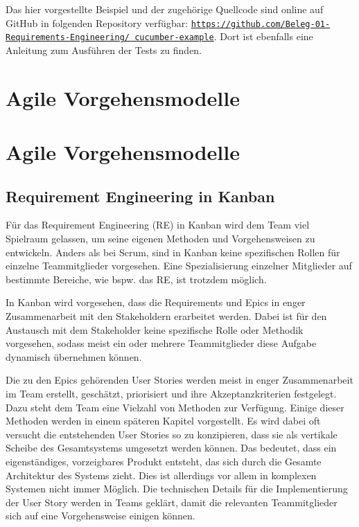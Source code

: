 \documentclass[acmtog]{acmart}
\begin{document}
Das hier vorgestellte Beispiel und der zugehörige Quellcode sind online auf GitHub in folgenden Repository verfügbar:
\href{https://github.com/Beleg-01-Requirements-Engineering/cucumber-example}{\texttt{https://github.com/Beleg-01-Requirements-Engineering/
		cucumber-example}}.
Dort ist ebenfalls eine Anleitung zum Ausführen der Tests zu finden.


\section{Agile Vorgehensmodelle}

\section{Agile Vorgehensmodelle}

\subsection{Requirement Engineering in Kanban}

Für das Requirement Engineering (RE) in Kanban wird dem Team viel Spielraum gelassen, 
um seine eigenen Methoden und Vorgehensweisen zu entwickeln. Anders als bei Scrum, sind 
in Kanban keine spezifischen Rollen für einzelne Teammitglieder vorgesehen. Eine 
Spezialisierung einzelner Mitglieder auf bestimmte Bereiche, wie bspw. das RE, ist trotzdem 
möglich.

In Kanban wird vorgesehen, dass die Requirements und Epics in enger Zusammenarbeit mit 
den Stakeholdern erarbeitet werden. Dabei ist für den Austausch mit dem Stakeholder keine 
spezifische Rolle oder Methodik vorgesehen, sodass meist ein oder mehrere Teammitglieder 
diese Aufgabe dynamisch übernehmen können. \cite{agileprocesses}

Die zu den Epics gehörenden User Stories werden meist in enger Zusammenarbeit im Team erstellt, 
geschätzt, priorisiert und ihre Akzeptanzkriterien festgelegt. Dazu steht dem Team eine Vielzahl 
von Methoden zur Verfügung. Einige dieser Methoden werden in einem späteren Kapitel vorgestellt. 
Es wird dabei oft versucht die entstehenden User Stories so zu konzipieren, dass sie als vertikale 
Scheibe des Gesamtsystems umgesetzt werden können. Das bedeutet, dass ein eigenständiges, vorzeigbares 
Produkt entsteht, das sich durch die Gesamte Architektur des Systems zieht. Dies ist allerdings 
vor allem in komplexen Systemen nicht immer Möglich. Die technischen Details für die Implementierung 
der User Story werden in Teams geklärt, damit die relevanten Teammitglieder sich auf eine Vorgehensweise 
einigen können. \cite{agileprocesses}
\end{document}
